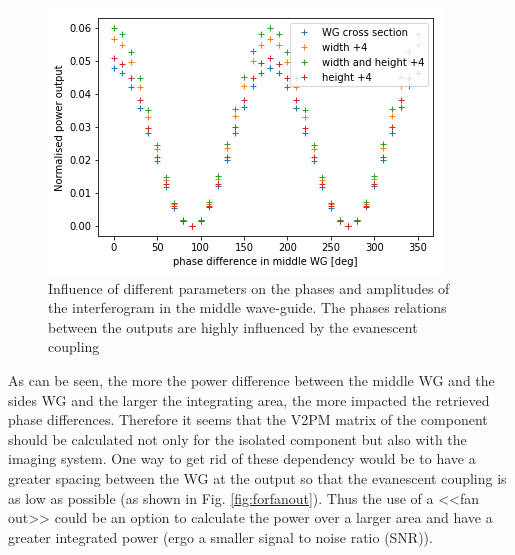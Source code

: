 \begin{figure}[htbp]
  \begin{minipage}[b]{.33\textwidth}
    \centering   \includegraphics[scale=.35]{picture/integrating_area/phase_python3.png}
  \end{minipage}
  \caption{Influence of different parameters on the phases and
    amplitudes of the interferogram in the middle wave-guide. The phases relations between the outputs are highly influenced by the evanescent coupling}
  \label{fig:phase_influence}
\end{figure}

As can be seen, the more the power difference between the middle WG
and the sides WG and the larger the integrating area, the more
impacted the retrieved phase differences. Therefore it seems that the V2PM matrix of the component should be calculated not only for the isolated component but also with the imaging system. One way to get rid of these dependency would be to have a greater spacing between the WG at the output so that the evanescent coupling is as low as possible (as shown in Fig. \ref{fig:forfanout}). Thus the use of a
<<fan out>> could be an option to calculate the power over a larger area and have  a greater integrated power
(ergo a smaller signal to noise ratio (SNR)).
